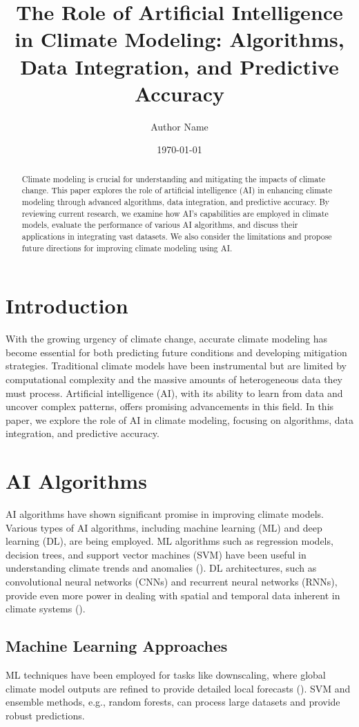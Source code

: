 \documentclass[12pt]{article}
\title{The Role of Artificial Intelligence in Climate Modeling: Algorithms, Data Integration, and Predictive Accuracy}
\author{Author Name}
\date{\today}
\begin{document}
\maketitle

\begin{abstract}
Climate modeling is crucial for understanding and mitigating the impacts of climate change. This paper explores the role of artificial intelligence (AI) in enhancing climate modeling through advanced algorithms, data integration, and predictive accuracy. By reviewing current research, we examine how AI's capabilities are employed in climate models, evaluate the performance of various AI algorithms, and discuss their applications in integrating vast datasets. We also consider the limitations and propose future directions for improving climate modeling using AI.
\end{abstract}

\section{Introduction}
With the growing urgency of climate change, accurate climate modeling has become essential for both predicting future conditions and developing mitigation strategies. Traditional climate models have been instrumental but are limited by computational complexity and the massive amounts of heterogeneous data they must process. Artificial intelligence (AI), with its ability to learn from data and uncover complex patterns, offers promising advancements in this field. In this paper, we explore the role of AI in climate modeling, focusing on algorithms, data integration, and predictive accuracy.

\section{AI Algorithms}
AI algorithms have shown significant promise in improving climate models. Various types of AI algorithms, including machine learning (ML) and deep learning (DL), are being employed. ML algorithms such as regression models, decision trees, and support vector machines (SVM) have been useful in understanding climate trends and anomalies (\cite{chen2018machine}). DL architectures, such as convolutional neural networks (CNNs) and recurrent neural networks (RNNs), provide even more power in dealing with spatial and temporal data inherent in climate systems (\cite{reichstein2019deep}).

\subsection{Machine Learning Approaches}
ML techniques have been employed for tasks like downscaling, where global climate model outputs are refined to provide detailed local forecasts (\cite{vandal2018deep}). SVM and ensemble methods, e.g., random forests, can process large datasets and provide robust predictions.
\end{document}
